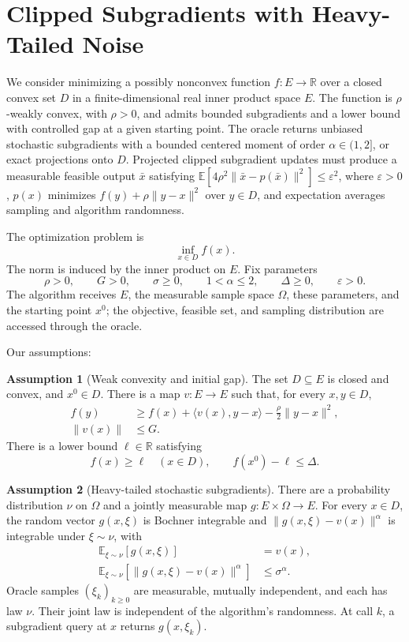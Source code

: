 \documentclass[10pt]{article}
\theoremstyle{definition}
\newtheorem{assumption}{Assumption}
\begin{document}
\section*{Clipped Subgradients with Heavy-Tailed Noise}
We consider minimizing a possibly nonconvex function $f:E\to\mathbb{R}$ over a closed convex set $D$ in a finite-dimensional real inner product space $E$. The function is $\rho$-weakly convex, with $\rho>0$, and admits bounded subgradients and a lower bound with controlled gap at a given starting point. The oracle returns unbiased stochastic subgradients with a bounded centered moment of order $\alpha\in(1,2]$, or exact projections onto $D$. Projected clipped subgradient updates must produce a measurable feasible output $\bar{x}$ satisfying $\mathbb{E}[4\rho^2\|\bar{x}-p(\bar{x})\|^2]\leq\varepsilon^2$, where $\varepsilon>0$, $p(x)$ minimizes $f(y)+\rho\|y-x\|^2$ over $y\in D$, and expectation averages sampling and algorithm randomness.

The optimization problem is
\[
\inf_{x\in D} f(x).
\]
The norm is induced by the inner product on $E$. Fix parameters
\[
\rho>0,\qquad G>0,\qquad \sigma\geq0,\qquad
1<\alpha\leq2,\qquad \Delta\geq0,\qquad \varepsilon>0.
\]
The algorithm receives $E$, the measurable sample space $\Omega$, these parameters, and the starting point $x^0$; the objective, feasible set, and sampling distribution are accessed through the oracle.

Our assumptions:
\begin{assumption}[Weak convexity and initial gap]
The set $D\subseteq E$ is closed and convex, and $x^0\in D$. There is a map $v:E\to E$ such that, for every $x,y\in D$,
\[
\begin{aligned}
f(y)&\geq f(x)+\langle v(x),y-x\rangle
       -\frac{\rho}{2}\|y-x\|^2,\\
\|v(x)\|&\leq G.
\end{aligned}
\]
There is a lower bound $\ell\in\mathbb{R}$ satisfying
\[
f(x)\geq\ell\quad(x\in D),\qquad f(x^0)-\ell\leq\Delta.
\]
\end{assumption}

\begin{assumption}[Heavy-tailed stochastic subgradients]
There are a probability distribution $\nu$ on $\Omega$ and a jointly measurable map $g:E\times\Omega\to E$. For every $x\in D$, the random vector $g(x,\xi)$ is Bochner integrable and $\|g(x,\xi)-v(x)\|^\alpha$ is integrable under $\xi\sim\nu$, with
\[
\begin{aligned}
\mathbb{E}_{\xi\sim\nu}[g(x,\xi)]&=v(x),\\
\mathbb{E}_{\xi\sim\nu}[\|g(x,\xi)-v(x)\|^\alpha]
&\leq\sigma^\alpha.
\end{aligned}
\]
Oracle samples $(\xi_k)_{k\geq0}$ are measurable, mutually independent, and each has law $\nu$. Their joint law is independent of the algorithm's randomness. At call $k$, a subgradient query at $x$ returns $g(x,\xi_k)$.
\end{assumption}
\end{document}
